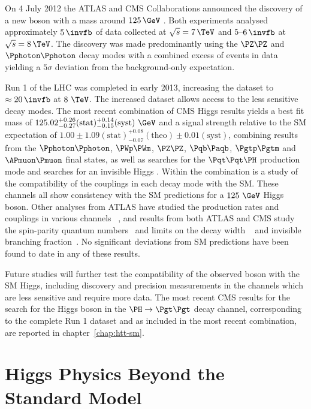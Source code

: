 On 4 July 2012 the ATLAS and CMS Collaborations announced the discovery of a new
boson with a mass around $125\,\GeV$ \cite{CMSobservation125,ATLASobservation125}. 
Both experiments analysed approximately $5\,\invfb$ of data collected at 
$\sqrt{s}=7\,\TeV$ and $5$--$6\,\invfb$ at $\sqrt{s}=8\,\TeV$. The discovery was
made predominantly using the $\PZ\PZ$ and $\Pphoton\Pphoton$ decay modes with a
combined excess of events in data yielding a $5\sigma$ deviation from the
background-only expectation.

Run 1 of the LHC was completed in early 2013, increasing the dataset to
$\approx20\,\invfb$ at $8~\TeV$. The increased dataset allows access to the less
sensitive decay modes. The most recent combination of CMS Higgs results yields a
best fit mass of
$125.02^{+0.26}_{-0.27}(\text{stat})^{+0.14}_{-0.15}(\text{syst})~\GeV$ and a
signal strength relative to the \ac{SM} expectation of
$1.00\pm1.09(\text{stat})^{+0.08}_{-0.07}(\text{theo})\pm0.01(\text{syst})$,
combining results from the $\Pphoton\Pphoton$, $\PWp\PWm$, $\PZ\PZ$,
$\Pqb\Paqb$, $\Pgtp\Pgtm$ and $\APmuon\Pmuon$ final states, as well as 
searches for the $\Pqt\Pqt\PH$ production mode and searches for an invisible
Higgs \cite{CMScomb}. Within the combination is a study of the compatibility of
the couplings in each decay mode with the \ac{SM}. 
These channels all show consistency with the \ac{SM}
predictions for a $125~\GeV$ Higgs boson. Other analyses from ATLAS have
studied the production rates and couplings in various channels
~\cite{Aad:2014eva,Aad:2014lwa,Aad:2015vsa}, and results from both ATLAS and CMS study 
the spin-parity quantum
numbers~\cite{Chatrchyan:2013mxa,Chatrchyan:2013iaa,Aad:2013xqa} and limits on
the decay width ~\cite{Khachatryan:2014iha} and invisible branching
fraction~\cite{Aad:2014iia,Chatrchyan:2014tja}. No significant deviations from \ac{SM}
predictions have been found to date in any of these results.

Future studies will further test the compatibility of the observed boson with
the \ac{SM} Higgs, including discovery and precision measurements in the
channels which are less sensitive and require more data. 
The most recent CMS results for the search for the Higgs boson in the $\HToTauTau$
decay channel, corresponding to the complete Run 1 dataset and as included in
the most recent combination, are reported in chapter~\ref{chap:htt-sm}.

\section{Higgs Physics Beyond the Standard Model}
\label{sec:BSM}

